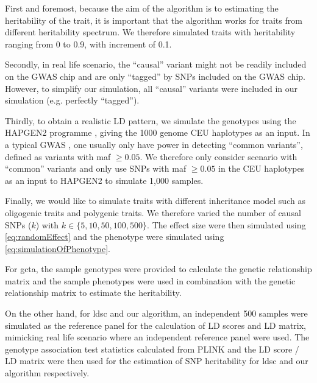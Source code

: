 			First and foremost, because the aim of the algorithm is to estimating the heritability of the trait, it is important that the algorithm works for traits from different heritability spectrum.
			We therefore simulated traits with heritability ranging from 0 to 0.9, with increment of 0.1.
		
			Secondly, in real life scenario, the ``causal'' variant might not be readily included on the \gls{GWAS} chip and are only ``tagged'' by \glspl{SNP} included on the \gls{GWAS} chip.
			However, to simplify our simulation, all ``causal'' variants were included in our simulation (e.g. perfectly ``tagged'').
		
			Thirdly, to obtain a realistic \gls{LD} pattern, we simulate the genotypes using the HAPGEN2 programme \citep{Su2011}, giving the 1000 genome \gls{CEU} haplotypes as an input.
			In a typical \gls{GWAS} , one usually only have power in detecting ``common variants'', defined as variants with \gls{maf} $\ge 0.05$.
			We therefore only consider scenario with ``common'' variants and only use \glspl{SNP} with \gls{maf} $\ge0.05$ in the \gls{CEU} haplotypes as an input to HAPGEN2 to simulate 1,000 samples.
			
			Finally, we would like to simulate traits with different inheritance model such as oligogenic traits and polygenic traits.
			We therefore varied the number of causal \glspl{SNP} ($k$) with $k\in\{5, 10, 50, 100, 500\}$.
			The effect size were then simulated using \cref{eq:randomEffect} and the phenotype were simulated using \cref{eq:simulationOfPhenotype}.
			
			For \gls{gcta}, the sample genotypes were provided to calculate the genetic relationship matrix and the sample phenotypes were used in combination with the genetic relationship matrix to estimate the heritability.
			
			On the other hand, for \gls{ldsc} and our algorithm, an independent 500 samples were simulated as the reference panel for the calculation of \gls{LD} scores and \gls{LD} matrix, mimicking real life scenario where an independent reference panel were used. 
			The genotype association test statistics calculated from PLINK and the \gls{LD} score / \gls{LD} matrix were then used for the estimation of \gls{SNP} heritability for \gls{ldsc} and our algorithm respectively. 
			
